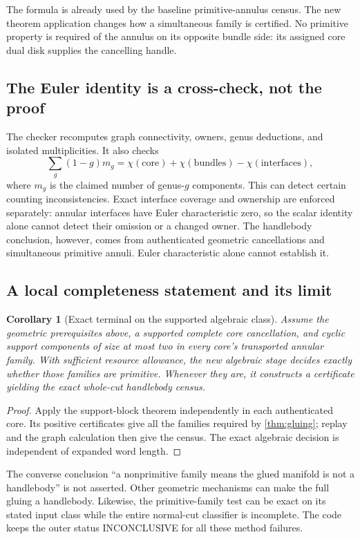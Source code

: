 \documentclass[11pt,a4paper]{article}
\newtheorem{corollary}[theorem]{Corollary}
\theoremstyle{definition}
\theoremstyle{remark}
\newcommand{\inconclusive}{\textsf{INCONCLUSIVE}}
\begin{document}
The formula is already used by the baseline primitive-annulus census. The
new theorem application changes how a simultaneous family is certified.
No primitive property is required of the annulus on its opposite bundle
side: its assigned core dual disk supplies the cancelling handle.

\subsection{The Euler identity is a cross-check, not the proof}

The checker recomputes graph connectivity, owners, genus deductions, and
isolated multiplicities. It also checks
\[
 \sum_g(1-g)m_g
 =\chi(\text{core})+\chi(\text{bundles})-\chi(\text{interfaces}),
\]
where $m_g$ is the claimed number of genus-$g$ components. This can detect
certain counting inconsistencies. Exact interface coverage and ownership
are enforced separately: annular interfaces have Euler characteristic zero,
so the scalar identity alone cannot detect their omission or a changed owner.
The handlebody conclusion,
however, comes from authenticated geometric cancellations and simultaneous
primitive annuli. Euler characteristic alone cannot establish it.

\subsection{A local completeness statement and its limit}

\begin{corollary}[Exact terminal on the supported algebraic class]
\label{cor:terminal}
Assume the geometric prerequisites above, a supported complete core
cancellation, and cyclic support components of size at most two in every
core's transported annular family. With sufficient resource allowance, the
new algebraic stage decides exactly whether those families are primitive.
Whenever they are, it constructs a certificate yielding the exact whole-cut
handlebody census.
\end{corollary}

\begin{proof}
Apply the support-block theorem independently in each authenticated core.
Its positive certificates give all the families required by
\cref{thm:gluing}; replay and the graph calculation then give the census.
The exact algebraic decision is independent of expanded word length.
\end{proof}

The converse conclusion ``a nonprimitive family means the glued manifold
is not a handlebody'' is not asserted. Other geometric mechanisms can make
the full gluing a handlebody. Likewise, the primitive-family test can be
exact on its stated input class while the entire normal-cut classifier is
incomplete. The code keeps the outer status \inconclusive{} for all these
method failures.
\end{document}
